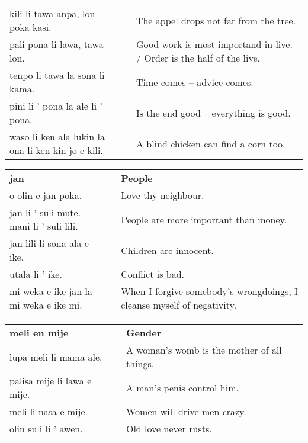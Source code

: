 \begin{supertabular}{p{6cm}|ll}
    kili li tawa anpa, lon poka kasi.                  &  & The appel drops not far from the tree.                                \\
    pali pona li lawa, tawa lon.                       &  & Good work is most importand in live. / Order is the half of the live. \\
    tenpo li tawa la sona li kama.                     &  & Time comes -- advice comes.                                           \\
    pini li ' pona la ale li ' pona.                   &  & Is the end good -- everything is good.                                \\
    waso li ken ala lukin la ona li ken kin jo e kili. &  & A blind chicken can find a corn too.                                  \\
\end{supertabular}

\begin{supertabular}{p{6cm}|ll}
    \textbf{jan}                             &  & \textbf{People}                                                        \\
    o olin e jan poka.                       &  & Love thy neighbour.                                                    \\
    jan li ' suli mute. mani li ' suli lili. &  & People are more important than money.                                  \\
    jan lili li sona ala e ike.              &  & Children are innocent.                                                 \\
    utala li ' ike.                          &  & Conflict is bad.                                                       \\
    mi weka e ike jan la mi weka e ike mi.   &  & When I forgive somebody's wrongdoings, I cleanse myself of negativity. \\
\end{supertabular}

\begin{supertabular}{p{6cm}|ll}
    \textbf{meli en mije}       &  & \textbf{Gender}                             \\
    lupa meli li mama ale.      &  & A woman's womb is the mother of all things. \\
    palisa mije li lawa e mije. &  & A man's penis control him.                  \\
    meli li nasa e mije.        &  & Women will drive men crazy.                 \\
    olin suli li ' awen.        &  & Old love never rusts.                       \\
\end{supertabular}


